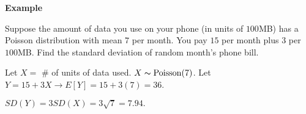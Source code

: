\textbf{Example}

Suppose the amount of data you use on your phone (in units of $ 100 $MB) has
a Poisson distribution with mean $ 7 $ per month. You pay $ 15 $ per
month plus $ 3 $ per $ 100 $MB\@. Find the standard deviation of random
month's phone bill.

Let $ X= $ \# of units of data used. $ X \thicksim \operatorname{Poisson}(7) $. Let
$ Y=15+3X\rightarrow E[Y]=15+3(7)=36 $.

$ SD(Y)=3SD(X)=3\sqrt{7}=7.94. $
